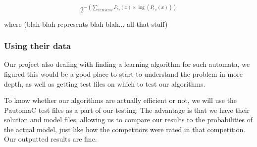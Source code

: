 {\huge{}
\[
2^{-(\sum_{x\epsilon TestSet}P_{r_{T}}(x)\times\log(P_{r_{C}}(x)))}
\]
}{\huge \par}

where (blah-blah represents blah-blah... all that stuff)


\subsubsection{Using their data}

\enskip{}\enskip{}\enskip{}Our project also dealing with finding
a learning algorithm for such automata, we figured this would be a
good place to start to understand the problem in more depth, as well
as getting test files on which to test our algorithms.

To know whether our algorithms are actually efficient or not, we will
use the PautomaC test files as a part of our testing. The advantage
is that we have their solution and model files, allowing us to compare
our results to the probabilities of the actual model, just like how
the competitors were rated in that competition. Our outputted results
are fine.